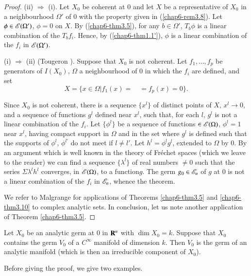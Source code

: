 \begin{proof}
(ii) $\Rightarrow$ (i). Let $X_{0}$ be coherent at $0$ and let $X$ be a representative of $X_{0}$ in a neighbourhood $\Omega'$ of $0$ with the property given in (\ref{chap6-rem3.8}). Let $\phi\in \mathscr{E}(\Omega')$, $\phi=0$ on $X$. By (\ref{chap6-thm3.5}), for any $b\in \Omega'$, $T_{b}\phi$ is a linear combination of the $T_{b}f_{i}$. Hence, by (\ref{chap6-thm1.1'}), $\phi$ is a linear combination of the $f_{i}$ in $\mathscr{E}(\Omega')$.

(i) $\Rightarrow$ (ii) (Tougeron \cite{J. C. Tougeron :1}). Suppose that $X_{0}$ is not coherent. Let $f_{1},\ldots,f_{p}$ be generators of $I(X_{0})$, $\Omega$ a neighbourhood of $0$ in which the $f_{i}$ are defined, and set
$$
X=\{x\in \Omega|f_{1}(x)=\quad = f_{p}(x)=0\}.
$$

Since $X_{0}$ is not coherent, there is a sequence $\{x^{l}\}$ of distinct points of $X$, $x^{l}\to 0$, and a sequence of functions $g^{l}$ defined near $x^{l}$, such that, for each $l$, $g^{l}$ is not a linear combination of the $f_{i}$. Let $\{\phi^{l}\}$ be a sequence of functions $\in \mathscr{E}(\Omega)$, $\phi^{l}=1$ near $x^{l}$, having compact support in $\Omega$ and in the set where $g^{l}$ is defined such that the supports of $\phi^{l}$, $\phi^{l'}$ do not meet if $l\neq l'$. Let $h^{l}=\phi^{l}g^{l}$, extended to $\Omega$ by $0$. By an argument which is well known in the theory of Fr\'echet spaces (which we leave to the reader) we can find a sequence $\{\lambda^{l}\}$ of real numbers $\neq 0$ such that the series $\Sigma \lambda^{l}h^{l}$ converges, in $\mathscr{E}(\Omega)$, to a function\pageoriginale $g$. The germ $g_{0}\in \mathscr{E}_{n}$ of $g$ at $0$ is not a linear combination of the $f_{i}$ in $\mathscr{E}_{n}$, whence the theorem.

We refer to Malgrange \cite{B. Malgrange : 3} for applications of Theorems \ref{chap6-thm3.5} and \ref{chap6-thm3.10} to complex analytic sets. In conclusion, let us note another application of Theorem \ref{chap6-thm3.5}.
\end{proof}

\begin{proposition}\label{chap6-prop3.11}
Let $X_{0}$ be an analytic germ at $0$ in $\mathbf{R}^{n}$ with $\dim X_{0}=k$. Suppose that $X_{0}$ contains the germ $V_{0}$ of a $C^{\infty}$ manifold of dimension $k$. Then $V_{0}$ is the germ of an analytic manifold (which is then an irreducible component of $X_{0}$).
\end{proposition}

Before giving the proof, we give two examples.

